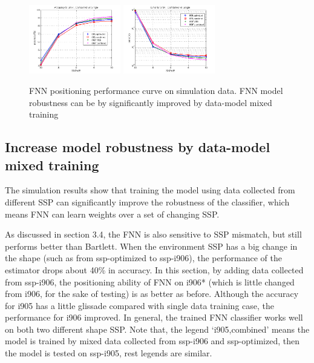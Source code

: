 \begin{figure}
\includegraphics[width=4cm,height=3cm]{figure/Accuracy_to_SNR_Combined_vs_Single}
\includegraphics[width=4cm,height=3cm]{figure/Error_to_SNR_Combined_vs_Single}
\caption{FNN positioning performance curve on simulation data. FNN model robustness can be by significantly improved by data-model mixed training}
\end{figure}

\subsection{%
Increase model robustness by data-model mixed training}
The simulation results show that training the model using data collected from different SSP can significantly improve the robustness of the classifier, which means FNN can learn weights over a set of changing SSP.


As discussed in section 3.4, the FNN is also sensitive to SSP mismatch, but still performs better than Bartlett. When the environment SSP has a big change in the shape (such as from ssp-optimized to ssp-i906), the performance of the estimator drops about 40\% in accuracy. In this section, by adding data collected from ssp-i906, the positioning ability of FNN on i906{*} (which is little changed from i906, for the sake of testing) is as better as before. Although the accuracy for i905 has a little glissade compared with single data training case, the performance for i906 improved. In general, the trained FNN classifier works well on both two different shape SSP. Note that, the legend `i905,combined' means the model is trained by mixed data collected from ssp-i906 and ssp-optimized, then the model is tested on ssp-i905, rest legends are similar.

